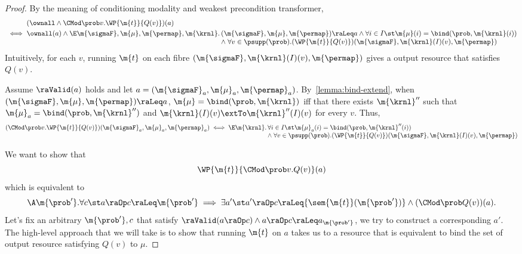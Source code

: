\documentclass[acmsmall,nonacm,screen,appendix]{acmart}
\begin{document}
\begin{proof}
    By the meaning of conditioning modality and weakest precondition transformer,
    \begin{align*}
    &(\ownall \land \CMod\prob v. \WP {\m{t}} {Q(v)})(a) \\
    {}\iff{}
    &\ownall(a) \land
    \begin{array}[t]{@{}r@{\,}l@{}}
    \E \m{\sigmaF}, \m{\mu}, \m{\permap}, \m{\krnl}.
      & (\m{\sigmaF}, \m{\mu}, \m{\permap}) \raLeq a
      \land
        \forall i\in I\st
        \m{\mu}(i) = \bind(\prob, \m{\krnl}(i))
      \\ & \land \;
        \forall v \in \psupp(\prob).
          (\WP {\m{t}} {Q(v)})(\m{\sigmaF}, \m{\krnl}(I)(v), \m{\permap})
    \end{array}
  \end{align*}
Intuitively, for each $v$,
  running $\m{t}$ on each fibre $(\m{\sigmaF}, \m{\krnl}(I)(v), \m{\permap})$
  gives a output resource that satisfies $Q(v)$.

  Assume $\raValid(a)$ holds and let
  $a = (\m{\sigmaF}_a, \m{\mu}_a, \m{\permap}_a)$.
  By~\cref{lemma:bind-extend},
  when $ (\m{\sigmaF}, \m{\mu}, \m{\permap}) \raLeq a$,
  $\m{\mu} = \bind(\prob, \m{\krnl})$ iff that there exists $\m{\krnl}''$ such that
  $\m{\mu}_a = \bind(\prob, \m{\krnl}'')$  and $\m{\krnl}(I)(v) \extTo \m{\krnl}''(I)(v)$ for every $v$.
  Thus,
\begin{align*}
    (\CMod\prob v. \WP {\m{t}} {Q(v)})(\m{\sigmaF}_a, \m{\mu}_a, \m{\permap}_a)
    \iff
    \begin{array}[t]{@{}r@{\,}l@{}}
    \E \m{\krnl}.
      &\forall i\in I\st
        \m{\mu}_a (i) = \bind(\prob, \m{\krnl}''(i))
        \\ & \land \;
        \forall v \in \psupp(\prob).
          (\WP {\m{t}} {Q(v)})(\m{\sigmaF}, \m{\krnl}(I)(v), \m{\permap})
    \end{array}
  \end{align*}

  We want to show that
  \[
      \WP {\m{t}}{\CMod\prob v. {Q(v)}} (a)
    \]
  which is equivalent to
  \[
        \A \m{\prob'}.
        \forall c\st
        a\raOp c \raLeq \m{\prob'}
          \implies
            \exists a'\st
            a'\raOp c \raLeq {\sem{\m{t}} (\m{\prob'})}
            \land
            (\CMod \prob Q(v))(a).
  \]
  Let's fix an arbitrary $ \m{\prob'}, c $ that satisfy
  $\raValid(a \raOp c) \land  a\raOp c \raLeq a_{\m{\prob'}}$,
  we try to construct a corresponding $a'$.
  The high-level approach that we will take is to show that running $\m{t}$ on $a$ takes us to a resource that is equivalent to bind the set of output resource satisfying $Q(v)$ to $\mu$.




\end{proof}
\end{document}

